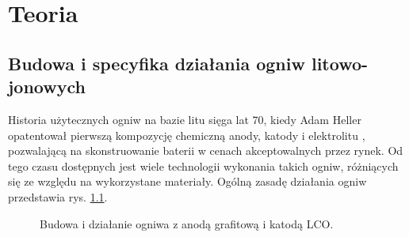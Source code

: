 \documentclass[polish,engineer]{polsl-msth}
\begin{document}
\chapter{Teoria}
\section{Budowa i specyfika działania ogniw litowo-jonowych}
Historia użytecznych ogniw na bazie litu sięga lat 70, kiedy Adam Heller opatentował pierwszą kompozycję chemiczną anody, katody i elektrolitu \cite{heller1975electrochemical}, pozwalającą na skonstruowanie baterii w cenach akceptowalnych przez rynek. Od tego czasu dostępnych jest wiele technologii wykonania takich ogniw, różniących się ze względu na wykorzystane materiały. Ogólną zasadę działania ogniw przedstawia   rys. \ref{img:liion_structure}.
\begin{figure}[hbtp]
\centering
     \caption{Budowa i działanie ogniwa z anodą grafitową i katodą LCO. \cite{liionpic_wikimedia}  \label{img:liion_structure}}
\end{figure}
\end{document}
